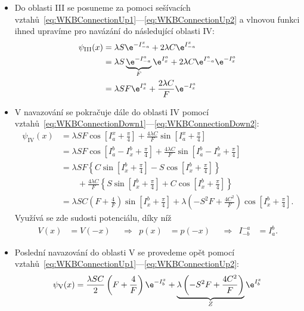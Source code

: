 \begin{solution}
\begin{enumerate}
\begin{itemize}
		\item
			Do oblasti III se posuneme za pomoci sešívacích vztahů~\eqref{eq:WKBConnectionUp1}---\eqref{eq:WKBConnectionUp2} a vlnovou funkci ihned upravíme pro navázání do následující oblasti IV:
			\begin{align}
				\psi_{\mathrm{III}}(x)
					&=\lambda S\e^{-I_{-a}^{x}}+2\lambda C\e^{I_{-a}^{x}}\nonumber\\
					&=\lambda S\underbrace{\e^{-I_{-a}^{a}}}_{F}\e^{I_{x}^{a}}+2\lambda C\e^{I_{-a}^{a}}\e^{-I_{x}^{a}}\nonumber\\
					&=\lambda SF\e^{I_{x}^{a}}+\frac{2\lambda C}{F}\e^{-I_{x}^{a}}
			\end{align}
			
		\item
			V navazování se pokračuje dále do oblasti IV pomocí vztahů~\eqref{eq:WKBConnectionDown1}---\eqref{eq:WKBConnectionDown2}:
			\begin{align}
				\psi_{\mathrm{IV}}(x)
					&=\lambda SF\cos\left[I_{a}^{x}+\frac{\pi}{4}\right]+\frac{4\lambda C}{F}\sin\left[I_{a}^{x}+\frac{\pi}{4}\right]\nonumber\\
					&=\lambda SF\cos\left[I_{a}^{b}-I_{x}^{b}+\frac{\pi}{4}\right]+\frac{4\lambda C}{F}\sin\left[I_{a}^{b}-I_{x}^{b}+\frac{\pi}{4}\right]\nonumber\\
					&=\lambda SF\left\{C\sin\left[I_{x}^{b}+\frac{\pi}{4}\right]-S\cos\left[I_{x}^{b}+\frac{\pi}{4}\right]\right\}\nonumber\\
					&\qquad+\frac{4\lambda C}{F}\left\{S\sin\left[I_{x}^{b}+\frac{\pi}{4}\right]+C\cos\left[I_{x}^{b}+\frac{\pi}{4}\right]\right\}\nonumber\\
					&=\lambda SC\left(F+\frac{4}{F}\right)\sin\left[I_{x}^{b}+\frac{\pi}{4}\right]+\lambda\left(-S^{2}F+\frac{4C^{2}}{F}\right)\cos\left[I_{x}^{b}+\frac{\pi}{4}\right].
			\end{align}
			Využívá se zde sudosti potenciálu, díky níž
			\begin{align}
				V(x)&=V(-x) && \Longrightarrow & p(x)&=p(-x) && \Longrightarrow & I_{-b}^{-a}&=I_{a}^{b}.
			\end{align}
			
		\item
			Poslední navazování do oblasti V se provedeme opět pomocí vztahů~\eqref{eq:WKBConnectionUp1}---\eqref{eq:WKBConnectionUp2}:
			\begin{equation}
				\psi_{\mathrm{V}}(x)=\frac{\lambda SC}{2}\left(F+\frac{4}{F}\right)\e^{-I_{b}^{x}}+\underbrace{\lambda\left(-S^{2}F+\frac{4C^{2}}{F}\right)}_{Z}\e^{I_{b}^{x}}
			\end{equation}		
		\end{itemize}
	

\end{enumerate}
\end{solution}
